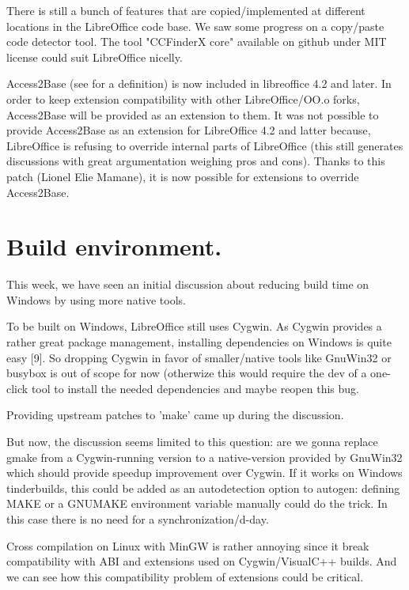 \documentclass{article}
\begin{document}
There is still a bunch of features that are copied/implemented at
different locations in the LibreOffice code base. We saw some progress on a copy/paste code detector tool\cite{copyPasteDetectorBug}. The tool "CCFinderX core" available on github under MIT license could suit LibreOffice nicelly\cite{copyPasteDetectorGithub}.

Access2Base (see \cite{access2BaseDefinition} for a definition) is now included in libreoffice 4.2 and later. In order to keep extension compatibility with other LibreOffice/OO.o forks, Access2Base will be provided as an extension to them. It was not possible to provide Access2Base as an extension for LibreOffice 4.2 and latter because, LibreOffice is refusing to override internal parts of LibreOffice (this still generates discussions with great argumentation weighing pros and cons\cite{coreOverrideArguments}). Thanks to this patch\cite{access2BaseOverridePatch} (Lionel Elie Mamane), it is now possible for extensions to override Access2Base.


\section{Build environment.}

This week, we have seen an initial discussion about reducing build time on Windows by using more native tools.

To be built on Windows, LibreOffice still uses Cygwin. As Cygwin provides a rather great package management, installing dependencies on Windows is quite easy [9]. So dropping Cygwin in favor of smaller/native tools like GnuWin32 or busybox is out of scope for now (otherwize this would require the dev of a one-click tool to install the needed dependencies\cite{winBuildDependenciesTool} and maybe reopen this bug\cite{winBuildDependenciesInstall}.

Providing upstream patches to 'make' came up during the discussion.

But now, the discussion seems limited to this question: are we gonna replace gmake from a Cygwin-running version to a native-version provided by GnuWin32 which should provide speedup improvement over Cygwin. If it works on Windows tinderbuilds, this could be added as an autodetection option to autogen: defining MAKE or a GNUMAKE environment variable manually could do the trick. In this case there is no need for a synchronization/d-day\cite{winBuildGmakeReplaceGnuWin32}.

Cross compilation on Linux with MinGW is rather annoying since it break compatibility with ABI and extensions used on Cygwin/VisualC++ builds. And we can see how this compatibility problem of extensions could be critical\cite{extensionsCompatibility}.
\end{document}
